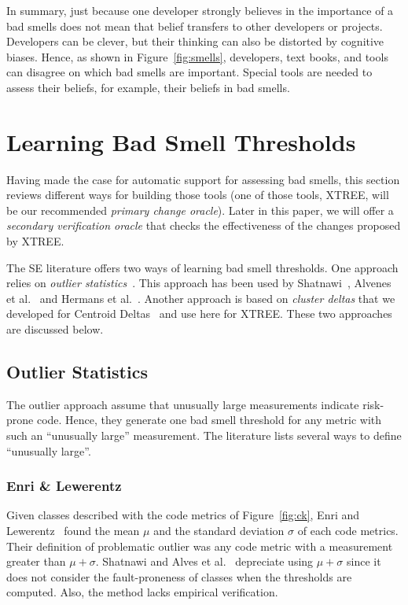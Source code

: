 \documentclass[twocolumn,5p]{elsarticle}
\newcommand{\fig}[1]{Figure~\ref{fig:#1}}
\theoremstyle{break}
\begin{document}
	In summary, just because one developer strongly believes in the importance of a bad smells does not mean that belief transfers to other developers or projects.
	Developers can be clever, but their thinking can also be distorted
	by cognitive biases.
	Hence, as shown in \fig{smells}, developers, text books, and tools 
	can disagree on which bad smells are important.
	Special tools are needed to assess their beliefs, for example, their beliefs in
	bad smells.  
	
	
	\section{Learning Bad Smell Thresholds}\label{sect:bst}
	
	Having made the case for automatic support for assessing bad smells,
	this section reviews different ways for building those tools (one of those tools,
	XTREE, will be our recommended {\em primary change oracle}).
	Later in this paper, we will offer  a {\em secondary verification oracle}
	that checks the effectiveness of the changes proposed by XTREE.
	
	The SE literature offers two ways of learning bad smell thresholds.
	One approach relies on 
	{\em outlier statistics}~\cite{erni96,bender99}. This approach
	has been used   by Shatnawi~\cite{Shatnawi10}, Alvenes et al.~\cite{Alves2010}
	and Hermans et al.~\cite{hermans15}.
	Another approach is 
	based on {\em cluster deltas} that we developed
	for   Centroid Deltas~\cite{me12c} and 
	use here for XTREE. 
	These two approaches are discussed below. 
	
	\subsection{Outlier Statistics}
	
	The outlier approach assume that unusually large measurements indicate risk-prone code.
	Hence, they generate one bad smell threshold for any metric
	with such an ``unusually large'' measurement. 
	The literature lists several ways to define ``unusually large''.
	
	
	
	
	
	\subsubsection{Enri \& Lewerentz}
	Given classes described with the  code metrics of \fig{ck},
	Enri and Lewerentz~\cite{erni96} found the   mean $\mu$ and the standard deviation $\sigma$
	of each
	code metrics. Their definition of problematic outlier was any code
	metric with a measurement greater than $\mu+\sigma$.
	Shatnawi and Alves et al.~\cite{Shatnawi10,Alves2010} depreciate
	using $\mu+\sigma$ since it does not consider the fault-proneness of classes when the thresholds are computed. Also, the method lacks  empirical verification.
	
\end{document}
